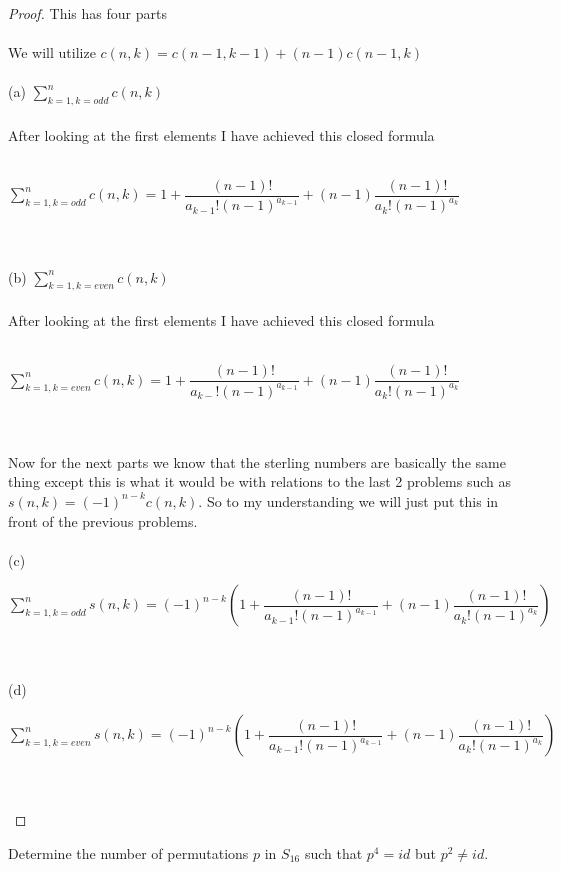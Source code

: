 \documentclass[12pt]{article}
\newenvironment{problem}[2][Problem]{\begin{trivlist}
\item[\hskip \labelsep {\bfseries #1}\hskip \labelsep {\bfseries #2.}]}{\end{trivlist}}
\begin{document}
\begin{proof}
This has four parts \\ \\
We will utilize $c(n,k)=c(n-1,k-1)+(n-1)c(n-1,k)$ \\ \\
(a) $\displaystyle{ \sum_{k=1, k = odd}^n c(n,k)}$ \\ \\
After looking at the first elements I have achieved this closed formula \\ \\
\centerline{$\displaystyle{ \sum_{k=1, k = odd}^n c(n,k)} = 1 + \displaystyle{\dfrac{(n-1)!}{a_{k-1}!(n-1)^{a_{k-1}}} + (n-1)\dfrac{(n-1)!}{a_k!(n-1)^{a_k}}}$} \\ \\
(b) $\displaystyle{ \sum_{k=1, k = even}^n c(n,k)}$ \\ \\
After looking at the first elements I have achieved this closed formula \\ \\
\centerline{$\displaystyle{ \sum_{k=1, k = even}^n c(n,k)} = 1 + \displaystyle{\dfrac{(n-1)!}{a_{k-}!(n-1)^{a_{k-1}}} + (n-1)\dfrac{(n-1)!}{a_k!(n-1)^{a_k}}}$} \\ \\
Now for the next parts we know that the sterling numbers are basically the same thing except this is what it would be with relations to the last 2 problems such as $s(n,k)=(-1)^{n-k}c(n,k)$. So to my understanding we will just put this in front of the previous problems. \\ \\
(c) \centerline{$\displaystyle{ \sum_{k=1, k = odd}^n s(n,k)} = (-1)^{n-k}(1 + \displaystyle{\dfrac{(n-1)!}{a_{k-1}!(n-1)^{a_{k-1}}} + (n-1)\dfrac{(n-1)!}{a_k!(n-1)^{a_k}}})$} \\ \\
(d) \centerline{$\displaystyle{ \sum_{k=1, k = even}^n s(n,k)} = (-1)^{n-k}(1 + \displaystyle{\dfrac{(n-1)!}{a_{k-1}!(n-1)^{a_{k-1}}} + (n-1)\dfrac{(n-1)!}{a_k!(n-1)^{a_k}}})$} \\ \\
\end{proof}

\begin{problem}{3}
Determine the number of permutations $p$ in $S_{16}$ such that $p^4 = id$ but $p^2 \neq id$.
\end{problem}
\end{document}
